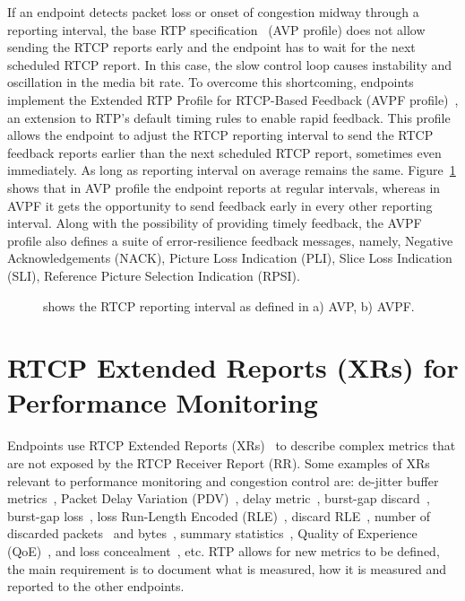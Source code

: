 
If an endpoint detects packet loss or onset of congestion midway through a
reporting interval, the base RTP specification~\cite{rfc3550} (AVP profile)
does not allow sending the RTCP reports early and the endpoint has to wait for
the next scheduled RTCP report. In this case, the slow control loop causes
instability and oscillation in the media bit rate. To overcome this
shortcoming, endpoints implement the Extended RTP Profile for RTCP-Based
Feedback (AVPF profile)~\cite{rfc4585}, an extension to RTP's default timing
rules to enable rapid feedback. This profile allows the endpoint to adjust the
RTCP reporting interval to send the RTCP feedback reports earlier than the
next scheduled RTCP report, sometimes even immediately. As long as reporting
interval on average remains the same. Figure~\ref{fig:3:avpf.interval} shows
that in AVP profile the endpoint reports at regular intervals, whereas in AVPF
it gets the opportunity to send feedback early in every other reporting
interval. Along with the possibility of providing timely feedback, the AVPF
profile also defines a suite of error-resilience feedback messages, namely,
Negative Acknowledgements (NACK), Picture Loss Indication (PLI), Slice Loss
Indication (SLI), Reference Picture Selection Indication (RPSI).

\begin{figure}[!t]
\caption{shows the RTCP reporting interval as defined in a) AVP, b) AVPF.}
\label{fig:3:avpf.interval}
\end{figure}




\section{RTCP Extended Reports (XRs) for Performance Monitoring}

Endpoints use RTCP Extended Reports (XRs)~\cite{rfc3611} to describe complex
metrics that are not exposed by the RTCP Receiver Report (RR). Some examples of
XRs relevant to performance monitoring and congestion control are: de-jitter
buffer metrics~\cite{rfc7005}, Packet Delay Variation (PDV)~\cite{rfc6798},
delay metric~\cite{rfc6843}, burst-gap discard~\cite{rfc7003}, burst-gap
loss~\cite{rfc6958}, loss Run-Length Encoded (RLE)~\cite{rfc3611}, discard
RLE~\cite{rfc7097}, number of discarded packets~\cite{rfc7002} and
bytes~\cite{draft.xr.bytes.discarded}, summary statistics~\cite{rfc7004},
Quality of Experience (QoE)~\cite{draft.xr.qoe}, and loss
concealment~\cite{draft.xr.conceal}, etc. RTP allows for new metrics to be
defined, the main requirement is to document what is measured, how it is
measured and reported to the other endpoints.



